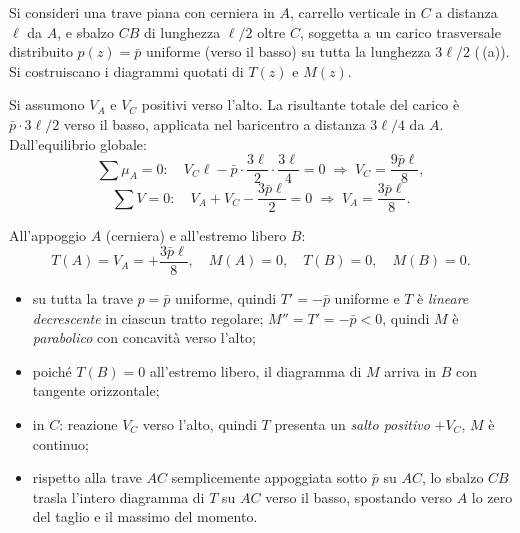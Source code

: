 \begin{esempio}
	Si consideri una trave piana con cerniera in $A$,
	carrello verticale in $C$ a distanza $\ell$ da $A$,
	e sbalzo $CB$ di lunghezza $\ell/2$ oltre $C$,
	soggetta a un carico trasversale distribuito
	$p(z) = \bar{p}$ uniforme (verso il basso) su
	tutta la lunghezza $3\ell/2$
	(\,(a)). Si costruiscano
	i diagrammi quotati di $T(z)$ e $M(z)$.
	
	\begin{svolgimento}
		
		
		
		Si assumono $V_A$ e $V_C$ positivi verso l'alto.
		La risultante totale del carico è $\bar p\cdot 3\ell/2$
		verso il basso, applicata nel baricentro a distanza
		$3\ell/4$ da $A$. Dall'equilibrio globale:
		\[
		\sum \mu_A = 0:\quad
		V_C\ell - \bar p\cdot\frac{3\ell}{2}\cdot\frac{3\ell}{4} = 0
		\;\Rightarrow\;
		V_C = \frac{9\bar p\ell}{8},
		\]
		\[
		\sum V = 0:\quad
		V_A + V_C - \frac{3\bar p\ell}{2} = 0
		\;\Rightarrow\;
		V_A = \frac{3\bar p\ell}{8}.
		\]
		
		All'appoggio $A$ (cerniera) e all'estremo libero $B$:
		\[
		T(A) = V_A = +\frac{3\bar p\ell}{8}, \quad
		M(A) = 0, \quad
		T(B) = 0, \quad M(B) = 0.
		\]
		
		\begin{itemize}[nosep]
			\item su tutta la trave $p = \bar p$ uniforme,
			quindi $T' = -\bar p$ uniforme e $T$ è
			\emph{lineare decrescente} in ciascun tratto
			regolare; $M'' = T' = -\bar p < 0$, quindi $M$
			è \emph{parabolico} con concavità verso l'alto;
			\item poiché $T(B) = 0$ all'estremo libero, il
			diagramma di $M$ arriva in $B$ con tangente
			orizzontale;
			\item in $C$: reazione $V_C$ verso l'alto, quindi
			$T$ presenta un \emph{salto positivo} $+V_C$, $M$
			è continuo;
			\item rispetto alla trave $AC$ semplicemente
			appoggiata sotto $\bar p$ su $AC$, lo sbalzo
			$CB$ trasla l'intero diagramma di $T$ su $AC$
			verso il basso, spostando verso $A$ lo zero del
			taglio e il massimo del momento.
		\end{itemize}
		
		

\end{svolgimento}
\end{esempio}
